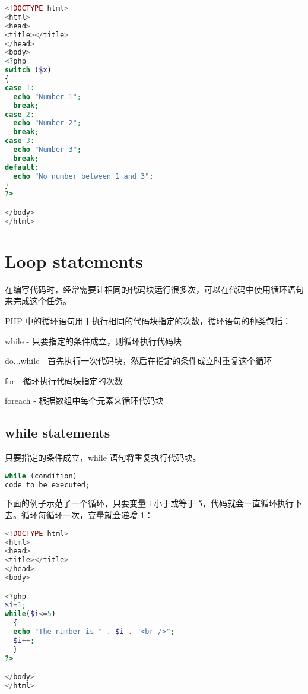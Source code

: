 \begin{lstlisting}[language=PHP]
<!DOCTYPE html>
<html>
<head>
<title></title>
</head>
<body>
<?php
switch ($x)
{
case 1:
  echo "Number 1";
  break;
case 2:
  echo "Number 2";
  break;
case 3:
  echo "Number 3";
  break;
default:
  echo "No number between 1 and 3";
}
?>

</body>
</html>
\end{lstlisting}

\section{Loop statements}



在编写代码时，经常需要让相同的代码块运行很多次，可以在代码中使用循环语句来完成这个任务。


PHP 中的循环语句用于执行相同的代码块指定的次数，循环语句的种类包括：


\begin{compactitem}
\item while - 只要指定的条件成立，则循环执行代码块
\item do...while - 首先执行一次代码块，然后在指定的条件成立时重复这个循环
\item for - 循环执行代码块指定的次数
\item foreach - 根据数组中每个元素来循环代码块
\end{compactitem}



\subsection{while statements}

只要指定的条件成立，while 语句将重复执行代码块。


\begin{lstlisting}[language=PHP]
while (condition)
code to be executed;
\end{lstlisting}

下面的例子示范了一个循环，只要变量 i 小于或等于 5，代码就会一直循环执行下去。循环每循环一次，变量就会递增 1：

\begin{lstlisting}[language=PHP]
<!DOCTYPE html>
<html>
<head>
<title></title>
</head>
<body>

<?php 
$i=1;
while($i<=5)
  {
  echo "The number is " . $i . "<br />";
  $i++;
  }
?>

</body>
</html>
\end{lstlisting}


